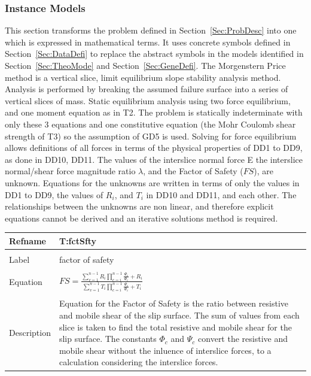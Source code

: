 \documentclass[12pt]{article}
\begin{document}
\subsubsection{Instance Models}
\label{Sec:InstMode}
This section transforms the problem defined in Section~\ref{Sec:ProbDesc} into one which is expressed in mathematical terms. It uses concrete symbols defined in Section~\ref{Sec:DataDefi} to replace the abstract symbols in the models identified in Section~\ref{Sec:TheoMode} and Section~\ref{Sec:GeneDefi}.
The Morgenstern Price method is a vertical slice, limit equilibrium slope stability analysis method. Analysis is performed by breaking the assumed failure surface into a series of vertical slices of mass. Static equilibrium analysis using two force equilibrium, and one moment equation as in T2. The problem is statically indeterminate with only these 3 equations and one constitutive equation (the Mohr Coulomb shear strength of T3) so the assumption of GD5 is used. Solving for force equilibrium allows definitions of all forces in terms of the physical properties of DD1 to DD9, as done in DD10, DD11.
The values of the interslice normal force E the interslice normal/shear force magnitude ratio $\lambda{}$, and the Factor of Safety ($FS$), are unknown. Equations for the unknowns are written in terms of only the values in DD1 to DD9, the values of $R_{i}$, and $T_{i}$ in DD10 and DD11, and each other. The relationships between the unknowns are non linear, and therefore explicit equations cannot be derived and an iterative solutions method is required.
~\newline
\noindent \begin{minipage}{\textwidth}
\begin{tabular}{p{} p{}}
\toprule \textbf{Refname} & \textbf{T:fctSfty}
\label{T:fctSfty}
\\ \midrule \\
Label & factor of safety
\\ \midrule \\
Equation & $FS=\frac{\sum_{v=1}^{n-1}{R_{i}\prod_{c=i}^{n-1}{\frac{\Psi{}_{c}}{\Phi{}_{c}}}}+R_{i}}{\sum_{v=1}^{n-1}{T_{i}\prod_{c=i}^{n-1}{\frac{\Psi{}_{c}}{\Phi{}_{c}}}}+T_{i}}$
\\ \midrule \\
Description & Equation for the Factor of Safety is the ratio between resistive and mobile shear of the slip surface. The sum of values from each slice is taken to find the total resistive and mobile shear for the slip surface. The constants $\Phi{}_{c}$ and $\Psi{}_{c}$ convert the resistive and mobile shear without the inluence of interslice forces, to a calculation considering the interslice forces.
\\ \bottomrule \end{tabular}
\end{minipage}\\
\end{document}
